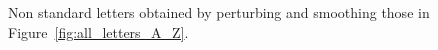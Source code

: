 \begin{figure}[htp]
  \caption{Non standard letters obtained by perturbing and smoothing
    those in Figure~\ref{fig:all_letters_A_Z}.}
  \label{fig:all_ptb_letters_A_Z}
\end{figure}




